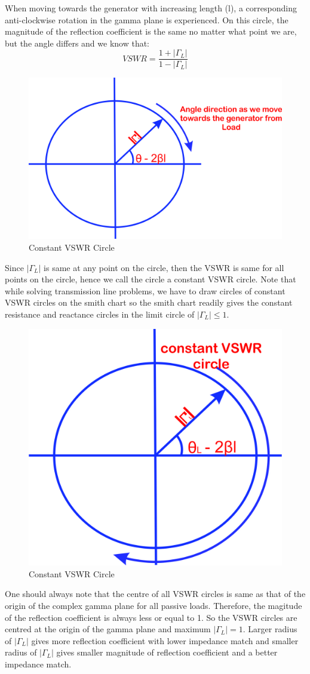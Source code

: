 When moving towards the generator with increasing length (l), a corresponding anti-clockwise rotation in the gamma plane is experienced. On this circle, the magnitude of the reflection coefficient is the same no matter what point we are, but the angle differs and we know that:
\begin{equation}
VSWR = \frac{1 + |\Gamma_L|}{1 - |\Gamma_L|}
\end{equation}
\begin{figure}[h]
\centering
\includegraphics[width=0.7\linewidth]{./graphics/lkjhgryn}
\caption{Constant VSWR Circle}
\label{fig:lkjhgryn}
\end{figure}
   	
Since $|\Gamma_L|$ is same at any point on the circle, then the VSWR is same for all points on the circle, hence we call the circle a constant VSWR circle. Note that while solving transmission line problems, we have to draw circles of constant VSWR circles on the smith chart so the smith chart readily gives the constant resistance and reactance circles in the limit circle of $|\Gamma_L|\leq 1$.
\begin{figure}[h]
\centering
\includegraphics[width=0.5\linewidth]{./graphics/qwertyhgf}
\caption{Constant VSWR Circle}
\label{fig:qwertyhgf}
\end{figure}

One should always note that the centre of all VSWR circles is same as that of the origin of  the complex gamma plane for all passive loads. Therefore, the magitude of the reflection coefficient is always less or equal to 1. So the VSWR circles are centred at the origin of the gamma plane and maximum $|\Gamma_L|=1$. Larger radius of $|\Gamma_L|$ gives more reflection coefficient with lower impedance match and smaller radius of  $|\Gamma_L|$ gives smaller magnitude of reflection coefficient and a better impedance match.

